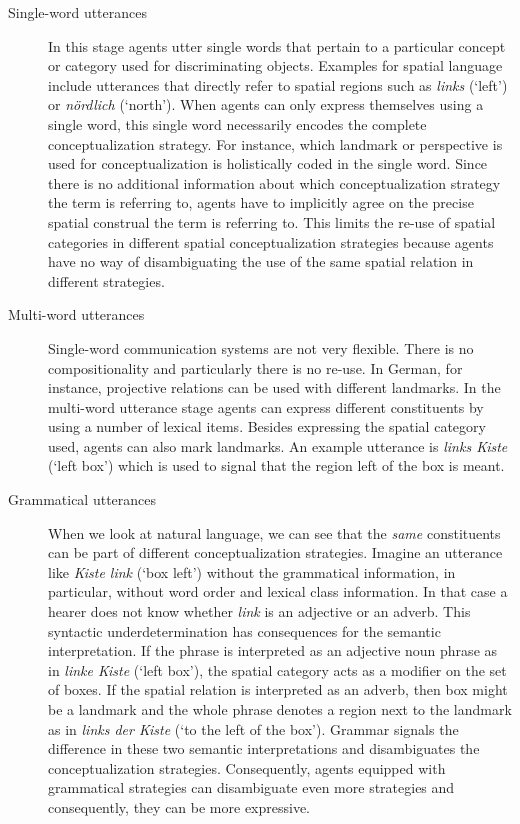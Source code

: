 \begin{description}
\item[Single-word utterances] In this stage agents utter single words that pertain to a particular concept
or category used for discriminating objects. Examples for spatial language include utterances that 
directly refer to spatial regions such as \textit{links} (`left') or \textit{n\"ordlich} (`north').
When agents can only express themselves using a single word, this single word necessarily encodes
the complete conceptualization strategy. For instance, which landmark or perspective is used for conceptualization is holistically coded in the single word. Since there is no additional information 
about which conceptualization strategy the term is referring to, agents have to implicitly agree on 
the precise spatial construal the term is referring to. This limits the re-use of spatial categories 
in different spatial conceptualization strategies because agents have no way of 
disambiguating the use of the same spatial relation in different strategies.
\item[Multi-word utterances] Single-word communication systems are not very flexible. 
There is no compositionality and particularly there is no re-use. In German, for instance,
projective relations can be used with different landmarks. In the multi-word utterance stage 
agents can express different constituents by using a number of lexical items. 
Besides expressing the spatial category used, agents can also 
mark landmarks. An example utterance is \textit{links Kiste} (`left box') which is used 
to signal that the region left of the box is meant.
\item[Grammatical utterances] When we look at natural language, we can see 
that the \emph{same} constituents can be part of different conceptualization strategies. 
Imagine an utterance like \textit{Kiste link} (`box left') without the grammatical information, in particular, 
without word order and lexical class information. In that case a hearer does not know whether 
\textit{link} is an adjective or an adverb. This syntactic underdetermination has consequences for 
the semantic interpretation. If the phrase is interpreted as an adjective noun phrase as in 
\textit{linke Kiste} (`left box'), the spatial category acts as a modifier on the set of boxes. If the 
spatial relation is interpreted as an adverb, then box might be a landmark and the whole phrase 
denotes a region next to the landmark as in \textit{links der Kiste} (`to the left of the box').
Grammar signals the difference in these two semantic interpretations and
disambiguates the conceptualization strategies. Consequently, agents equipped with grammatical
strategies can disambiguate even more strategies and consequently, they can be more expressive.
\end{description}

